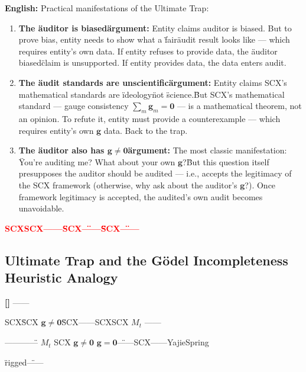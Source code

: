 \documentclass[12pt,a4paper]{article}
\theoremstyle{remark}
\newcommand{\g}{\mathbf{g}}
\newcommand{\honestcrit}[1]{%
    \textcolor{red}{\textbf{#1}}%
}
\begin{document}
\vspace{6pt}
\noindent
\textbf{English:} Practical manifestations of the Ultimate Trap:

\begin{enumerate}[label=(\arabic*)]
    \item \textbf{The \"auditor is biased\" argument:} Entity claims auditor is biased. But to prove bias, entity needs to show what a \"fair\" audit result looks like — which requires entity's own data. If entity refuses to provide data, the \"auditor biased\" claim is unsupported. If entity provides data, the data enters audit.
    
    \item \textbf{The \"audit standards are unscientific\" argument:} Entity claims SCX's mathematical standards are \"ideology\" not \"science.\" But SCX's mathematical standard — gauge consistency $ \sum_m \g_m = \mathbf{0} $ — is a mathematical theorem, not an opinion. To refute it, entity must provide a counterexample — which requires entity's own $ \g $ data. Back to the trap.
    
    \item \textbf{The \"auditor also has $ \g \neq \mathbf{0} $\" argument:} The most classic manifestation: \"You're auditing me? What about your own $ \g $?\" But this question itself presupposes the auditor should be audited — i.e., accepts the legitimacy of the SCX framework (otherwise, why ask about the auditor's $ \g $?). Once framework legitimacy is accepted, the audited's own audit becomes unavoidable.
\end{enumerate}

\honestcrit{SCXSCX——\"SCX\"——\"\"\"SCX\"——}

\subsection{}
\subsection{Ultimate Trap and the G\"{o}del Incompleteness Heuristic Analogy}

\noindent
\textbf{} \textbf{[]} ——

SCX\"SCX $ \g \neq \mathbf{0} $\"SCX\textbf{}——SCXSCX\textbf{} $ M_t $ ——

————\textbf{}\" $ M_t $ SCX $ \g \neq \mathbf{0} $ $ \g = \mathbf{0} $\"——SCX——YajieSpring

\textbf{} \textbf{}\" rigged\"——
\end{document}

